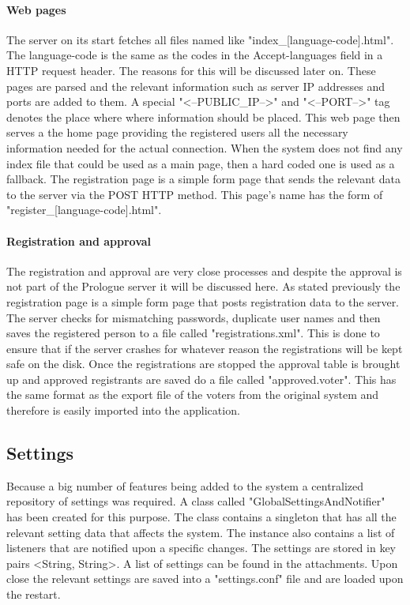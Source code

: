 \documentclass[11pt,twoside,a4paper]{book}
\begin{document}
\paragraph{Web pages}
The server on its start fetches all files named like "index_[language-code].html". The language-code is the same as the codes in the Accept-languages\cite{httpHead} field in a HTTP request header. The reasons for this will be discussed later on. These pages are parsed and the relevant information such as server IP addresses and ports are added to them. A special "<--PUBLIC_IP-->" and "<--PORT-->" tag denotes the place where where information should be placed.  This web page then serves a the home page providing the registered users all the necessary information needed for the actual connection. When the system does not find any index file that could be used as a main page, then a hard coded one is used as a fallback. The registration page is a simple form page that sends the relevant data to the server via the POST HTTP method. This page's name has the form of "register_[language-code].html".
\paragraph{Registration and approval}
The registration and approval are very close processes and despite the approval is not part of the Prologue server it will be discussed here. As stated previously the registration page is a simple form page that posts registration data to the server. The server checks for mismatching passwords, duplicate user names and then saves the registered person to a file called "registrations.xml". This is done to ensure that if the server crashes for whatever reason the registrations will be kept safe on the disk. Once the registrations are stopped the approval table is brought up and approved registrants are saved do a file called "approved.voter". This has the same format as the export file of the voters from the original system and therefore is easily imported into the application.

\subsection{Settings}
Because a big number of features being added to the system a centralized repository of settings was required. A class called "GlobalSettingsAndNotifier" has been created for this purpose. The class contains a singleton that has all the relevant setting data that affects the system. The instance also contains a list of listeners that are notified upon a specific changes. The settings are stored in key pairs <String, String>. A list of settings can be found in the attachments. Upon close the relevant settings are saved into a "settings.conf" file and are loaded upon the restart.
\end{document}
